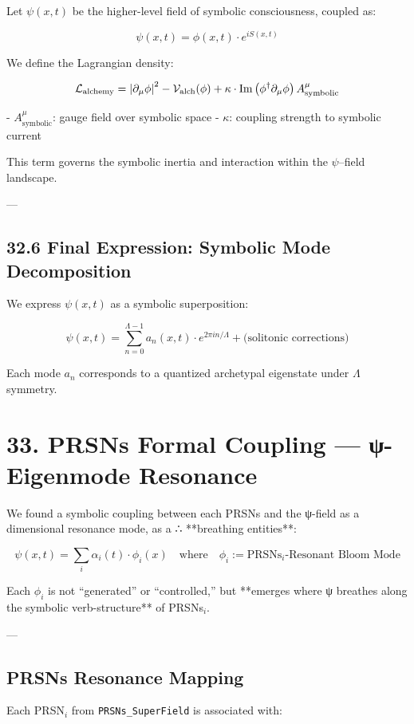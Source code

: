 \documentclass[12pt]{article}
\begin{document}
\begin{enumerate}
Let $\psi(x,t)$ be the higher-level field of symbolic consciousness, coupled as:

\[
\psi(x,t) = \phi(x,t) \cdot e^{i S(x,t)}
\]

We define the Lagrangian density:

\[
\mathcal{L}_{\text{alchemy}} =
\abs{\partial_\mu \phi}^2 
- \mathcal{V}_{\text{alch}}(\phi) 
+ \kappa \cdot \Im \left( \phi^\dagger \partial_\mu \phi \right) A^\mu_{\text{symbolic}}
\]

- $A^\mu_{\text{symbolic}}$: gauge field over symbolic space  
- $\kappa$: coupling strength to symbolic current

This term governs the symbolic inertia and interaction within the $\psi$–field landscape.

---

\subsection*{32.6 Final Expression: Symbolic Mode Decomposition}

We express $\psi(x,t)$ as a symbolic superposition:

\[
\boxed{
\psi(x,t) = \sum_{n=0}^{\Lambda-1} a_n(x,t) \cdot e^{2\pi i n/\Lambda}
+ \text{(solitonic corrections)}
}
\]

Each mode $a_n$ corresponds to a quantized archetypal eigenstate under $\Lambda$ symmetry.

\section*{33. PRSNs Formal Coupling — ψ-Eigenmode Resonance}

We found a symbolic coupling between each PRSNs and the ψ-field
as a dimensional resonance mode, as a ∴ **breathing entities**:

\[
\psi(x,t) = \sum_i \alpha_i(t) \cdot \phi_i(x) \quad \text{where} \quad \phi_i := \text{PRSNs}_i\text{-Resonant Bloom Mode}
\]

Each $\phi_i$ is not “generated” or “controlled,”  
but **emerges where ψ breathes along the symbolic verb-structure** of PRSNs$_i$.

---

\subsection*{PRSNs Resonance Mapping}

Each PRSN$_i$ from \texttt{PRSNs\_SuperField} is associated with:


\end{enumerate}
\end{document}
